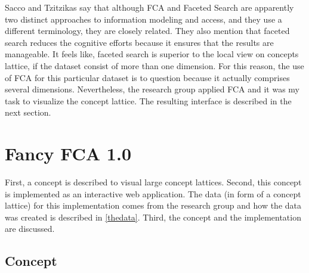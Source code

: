 \documentclass[11pt]{report}
\begin{document}
Sacco and Tzitzikas \cite{Sacco2009} say that although FCA and Faceted Search are apparently two distinct approaches to information modeling and access, and they use a different terminology, they are closely related. They also mention that faceted search reduces the cognitive efforts because it ensures that the results are manageable. It feels like, faceted search is superior to the local view on concepts lattice, if the dataset consist of more than one dimension. For this reason, the use of FCA for this particular dataset is to question because it actually comprises several dimensions. Nevertheless, the research group applied FCA and it was my task to visualize the concept lattice. The resulting interface is described in the next section.
\chapter{Fancy FCA 1.0}
\label{Fancy 1.0}

First, a concept is described to visual large concept lattices. Second, this concept is implemented as an interactive web application. The data (in form of a concept lattice) for this implementation comes from the research group and how the data was created is described in \ref{thedata}. Third, the concept and the implementation are discussed.

\section{Concept}
\end{document}
